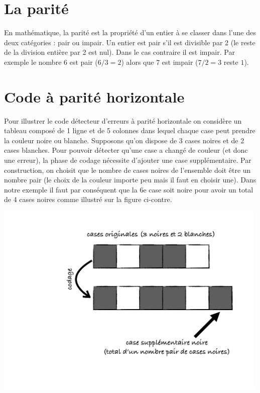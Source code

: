 \documentclass[frenchb,11pt]{article}
\begin{document}
\section*{La parité}

\noindent
En mathématique, la parité est la propriété d'un entier à se classer dans l'une des deux catégories : pair ou impair.
Un entier est pair s'il est divisible par 2 (le reste de la division entière par 2 est nul).
Dans le cas contraire il est impair.
Par exemple le nombre 6 est pair ($6/3 = 2$) alors que 7 est impair ($7/2 = 3$ reste $1$).

\section*{Code à parité horizontale}

\hspace*{-\parindent}%
\begin{minipage}{0.6\linewidth}
Pour illustrer le code détecteur d'erreurs à parité horizontale on considère un tableau composé de 1 ligne et de 5 colonnes dans lequel chaque case peut prendre la couleur noire ou blanche.
Supposons qu'on dispose de 3 cases noires et de 2 cases blanches.
Pour pouvoir détecter qu'une case a changé de couleur (et donc une erreur), la phase de codage nécessite d'ajouter une case supplémentaire.
Par construction, on choisit que le nombre de cases noires de l'ensemble doit être un nombre pair (le choix de la couleur importe peu mais il faut en choisir une).
Dans notre exemple il faut par conséquent que la 6e case soit noire pour avoir un total de 4 cases noires comme illustré sur la figure ci-contre.
\end{minipage}
\begin{minipage}{0.4\linewidth}
\includegraphics[width=0.99\textwidth]{building.pdf}
\end{minipage}
\end{document}
